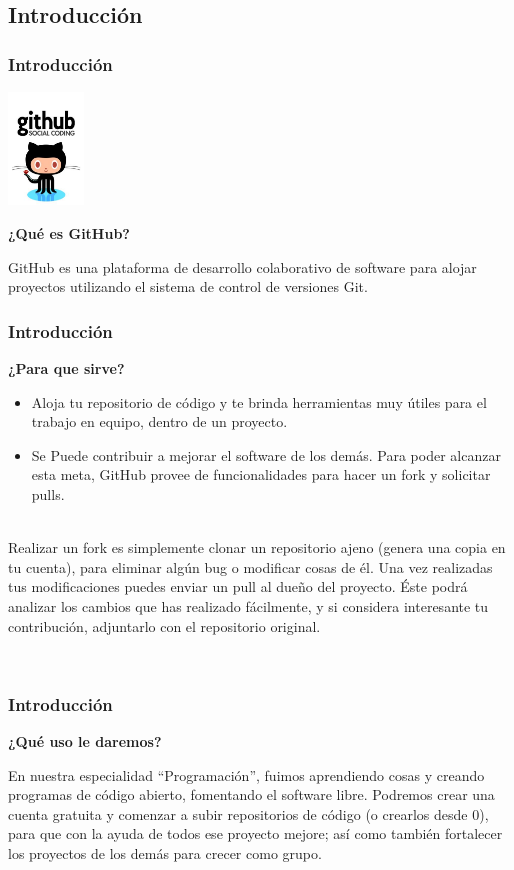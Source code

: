 \documentclass{beamer}
\begin{document}
\subsection{Introducción}
		\begin{frame}
			\frametitle{Introducción}
			\begin{center}\includegraphics[width=2cm, height=3cm]{git.jpg}\end{center}
			\begin{center}\textbf{\Large ¿Qué es GitHub?}\end{center}
			GitHub es una plataforma de desarrollo colaborativo de software para alojar proyectos utilizando el 						sistema de control de versiones Git.\\
		\end{frame}
		\begin{frame}
			\frametitle{Introducción}
			\begin{center}\textbf{\Large ¿Para que sirve?}\end{center}
			{\small \begin{itemize}
			\item Aloja tu repositorio de código y te brinda herramientas muy útiles para el trabajo en equipo, dentro 			de un proyecto.
			\item Se Puede contribuir a mejorar el software de los demás. Para poder alcanzar esta meta, GitHub provee 			de funcionalidades para hacer un fork y solicitar pulls.
			\end{itemize}\ \\
			Realizar un fork es simplemente clonar un repositorio ajeno (genera una copia en tu 						cuenta), para eliminar 	algún bug o modificar cosas de él. Una vez realizadas tus modificaciones puedes 					enviar un pull al dueño del proyecto. Éste podrá analizar los cambios que has realizado fácilmente, y si 				considera interesante tu contribución, adjuntarlo con el repositorio original.}
			\\
		\end{frame}
		\begin{frame}
			\frametitle{Introducción}
			\begin{center}\textbf{\Large ¿Qué uso le daremos?}\end{center}
			{\small En nuestra especialidad “Programación”, fuimos aprendiendo cosas y creando programas de 							código abierto, fomentando el software libre.
			Podremos crear una cuenta gratuita y comenzar a subir repositorios de código (o crearlos desde 0), para 					que con la ayuda de todos ese proyecto mejore; así como también fortalecer los proyectos de los demás para 			crecer como grupo.}
		\end{frame}
\end{document}
